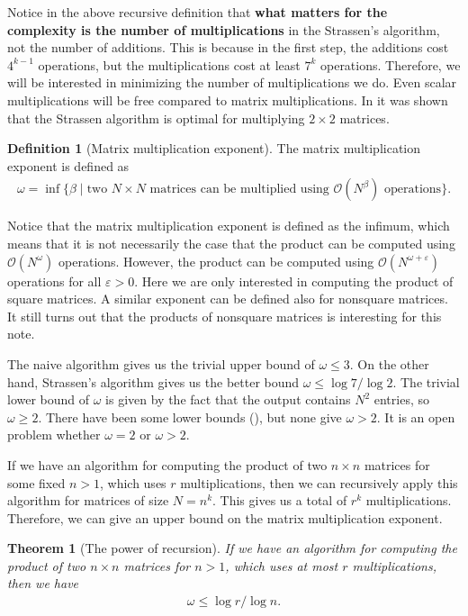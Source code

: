 \documentclass{article}
\theoremstyle{plain}
\newtheorem{theorem}{Theorem}
\theoremstyle{definition}
\newtheorem{definition}{Definition}
\theoremstyle{remark}
\begin{document}
Notice in the above recursive definition that \textbf{what matters for the complexity is the number of multiplications} in the Strassen's algorithm, not the number of additions. This is because in the first step, the additions cost $4^{k-1}$ operations, but the multiplications cost at least $7^k$ operations. Therefore, we will be interested in minimizing the number of multiplications we do. Even scalar multiplications will be free compared to matrix multiplications. In \cite{winograd1971multiplication} it was shown that the Strassen algorithm is optimal for multiplying $2 \times 2$ matrices.

\begin{definition}[Matrix multiplication exponent]\label{def:omega_1}
The matrix multiplication exponent is defined as
\begin{align*}
    \omega = \inf \{ \beta \mid \text{two $N \times N$ matrices can be multiplied using $\mathcal{O}(N^\beta)$ operations}  \}.
\end{align*}
\end{definition}

Notice that the matrix multiplication exponent is defined as the infimum, which means that it is not necessarily the case that the product can be computed using $\mathcal{O}(N^\omega)$ operations. However, the product can be computed using $\mathcal{O}(N^{\omega + \varepsilon})$ operations for all $\varepsilon > 0$. Here we are only interested in computing the product of square matrices. A similar exponent can be defined also for nonsquare matrices. It still turns out that the products of nonsquare matrices is interesting for this note.

The naive algorithm gives us the trivial upper bound of $\omega \leq 3$. On the other hand, Strassen's algorithm gives us the better bound $\omega \leq \log 7 / \log 2$. The trivial lower bound of $\omega$ is given by the fact that the output contains $N^2$ entries, so $\omega \geq 2$. There have been some lower bounds (\cite{blaeser1999lower}), but none give $\omega > 2$. It is an open problem whether $\omega = 2$ or $\omega > 2$.

If we have an algorithm for computing the product of two $n \times n$ matrices for some fixed $n > 1$, which uses $r$ multiplications, then we can recursively apply this algorithm for matrices of size $N = n^k$. This gives us a total of $r^k$ multiplications. Therefore, we can give an upper bound on the matrix multiplication exponent.

\begin{theorem}[The power of recursion]\label{thm:power_of_recursion_1}
If we have an algorithm for computing the product of two $n \times n$ matrices for $n > 1$, which uses at most $r$ multiplications, then we have
\begin{align*}
    \omega \leq \log r / \log n.
\end{align*}
\end{theorem}
\end{document}
